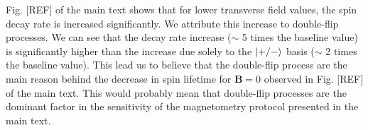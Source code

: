 \documentclass[preprintnumbers,amsmath,amssymb,onecolumn,12pt]{revtex4-2}\usepackage{graphicx}%
\begin{document}
Fig. [REF] of the main text shows that for lower transverse field values, the spin decay rate is increased significantly. We attribute this increase to double-flip processes. We can see that the decay rate increase ($\sim$ 5 times the baseline value) is significantly higher than the increase due solely to the $\ket{+/-}$ basis ($\sim$ 2 times the baseline value). This lead us to believe that the double-flip process are the main reason behind the decrease in spin lifetime for $\bm B=0$ observed in Fig. [REF] of the main text. This would probably mean that double-flip processes are the dominant factor in the sensitivity of the magnetometry protocol presented in the main text.


{}
\end{document}
